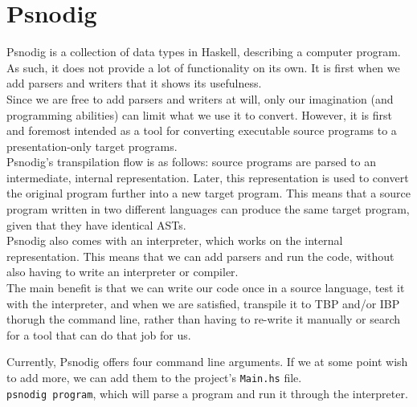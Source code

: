 \section{Psnodig}

Psnodig is a collection of data types in Haskell, describing a computer program. As such, it does not provide a lot of functionality on its own. It is first when we add parsers and writers that it shows its usefulness. \hfill \\

Since we are free to add parsers and writers at will, only our imagination (and programming abilities) can limit what we use it to convert. However, it is first and foremost intended as a tool for converting executable source programs to a presentation-only target programs. \hfill \\

Psnodig's transpilation flow is as follows: source programs are parsed to an intermediate, internal representation. Later, this representation is used to convert the original program further into a new target program. This means that a source program written in two different languages can produce the same target program, given that they have identical ASTs. \hfill \\

Psnodig also comes with an interpreter, which works on the internal representation. This means that we can add parsers and run the code, without also having to write an interpreter or compiler. \hfill \\

The main benefit is that we can write our code once in a source language, test it with the interpreter, and when we are satisfied, transpile it to TBP and/or IBP thorugh the command line, rather than having to re-write it manually or search for a tool that can do that job for us. \hfill \\


Currently, Psnodig offers four command line arguments. If we at some point wish to add more, we can add them to the project's \texttt{Main.hs} file. \hfill \\

\texttt{psnodig program}, which will parse a program and run it through the interpreter. \hfill \\

